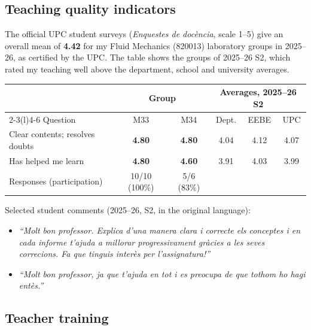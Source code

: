 \documentclass[11pt]{article}
\begin{document}
\subsection{Teaching quality indicators}\label{sec:surveys}
The official UPC student surveys (\emph{Enquestes de doc\`encia}, scale 1--5) give an
overall mean of \textbf{4.42} for my Fluid Mechanics (820013) laboratory groups in
2025--26, as certified by the UPC. The table shows the groups of 2025--26 S2, which rated
my teaching well above the department, school and university averages.
\begin{center}\small
\begin{tabular}{@{}lccccc@{}}
\toprule
 & \multicolumn{2}{c}{Group} & \multicolumn{3}{c}{Averages, 2025--26 S2} \\
\cmidrule(lr){2-3}\cmidrule(l){4-6}
Question & M33 & M34 & Dept. & EEBE & UPC \\
\midrule
Clear contents; resolves doubts & \textbf{4.80} & \textbf{4.80} & 4.04 & 4.12 & 4.07 \\
Has helped me learn & \textbf{4.80} & \textbf{4.60} & 3.91 & 4.03 & 3.99 \\
\midrule
Responses (participation) & 10/10 (100\%) & 5/6 (83\%) & & & \\
\bottomrule
\end{tabular}
\end{center}
Selected student comments (2025--26, S2, in the original language):
\begin{itemize}
  \item \emph{``Molt bon professor. Explica d'una manera clara i correcte els conceptes i en
  cada informe t'ajuda a millorar progressivament gr\`acies a les seves correcions. Fa que
  tinguis inter\`es per l'assignatura!''}
  \item \emph{``Molt bon professor, ja que t'ajuda en tot i es preocupa de que tothom ho hagi
  ent\`es.''}
\end{itemize}

\subsection{Teacher training}\label{sec:training}
\end{document}
